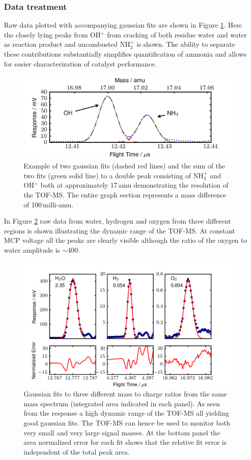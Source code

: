 \documentclass[aip,rsi]{revtex4-1}
\begin{document}
\subsubsection{Data treatment}
Raw data plotted with accompanying gaussian fits are shown in Figure \ref{fig:gaussian_fit}. Here the closely lying peaks from OH$^{+}$ from cracking of both residue water and water as reaction product and uncombusted NH$_3^{+}$ is shown. The ability to separate these contributions substantially simplifies quantification of ammonia and allows for easier characterization of catalyst performance. 
\begin{figure}
 \includegraphics[width=14cm]{ammonia_OH_gauss_fit.png}%
 \caption{Example of two gaussian fits (dashed red lines) and the sum of the two fits (green solid line) to a double peak consisting of NH$_{3}^{+}$ and OH$^{+}$ both at approximately 17\,amu demonstrating the resolution of the TOF-MS. The entire graph section represents a mass difference of 100\,milli-amu.\label{fig:gaussian_fit}}%
\end{figure}
In Figure \ref{fig:dynamic_range} raw data from water, hydrogen and oxygen from three different regions is shown illustrating the dynamic range of the TOF-MS. At constant MCP voltage all the peaks are clearly visible although the ratio of the oxygen to water amplitude is $\sim$400. 
\begin{figure}
 \includegraphics[width=14cm]{dynamic_range.png}%
 \caption{Gaussian fits to three different mass to charge ratios from the same mass spectrum (integrated area indicated in each panel). As seen from the response a high dynamic range of the TOF-MS all yielding good gaussian fits. The TOF-MS can hence be used to monitor both very small and very large signal masses. At the bottom panel the area normalized error for each fit shows that the relative fit error is independent of the total peak area.\label{fig:dynamic_range}}%
\end{figure}
\end{document}
